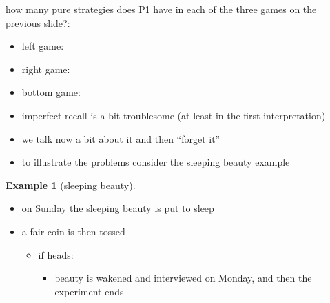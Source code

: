 \documentclass{beamer}    %
\newcommand{\Ra}{\Rightarrow}
\theoremstyle{plain}
\theoremstyle{definition}
\newtheorem{ex}{Example}
\begin{document}
{\framebreak

how many pure strategies does P1 have in each of the three games on the previous slide?:
\begin{itemize}
\item left game: %
\item right game: %
\item bottom game: %
\end{itemize}


\begin{itemize}
\item imperfect recall is a bit troublesome (at least in the first
  interpretation) 
\item we talk now a bit about it and then ``forget it''
\item  to illustrate the problems consider the sleeping beauty example
\end{itemize}

\begin{ex}[sleeping beauty]
  \begin{itemize}
  \item  on Sunday the sleeping beauty  is put to sleep
  \item a fair coin is then tossed
    \begin{itemize}
    \item if heads:
      \begin{itemize}
      \item beauty is wakened and interviewed on Monday, and then the
        experiment ends
      \end{itemize}


\end{itemize}
\end{itemize}
\end{ex}}
\end{document}
